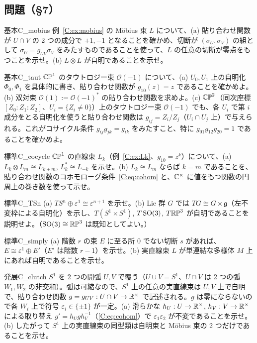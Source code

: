 \subsection*{問題（§7）}
\begin{probl}{基本}{C_mobius}
例~\ref{C:ex:mobius} の Möbius 束 $L$ について、(a) 貼り合わせ関数が $U\cap V$ の 2 つの成分で $+1,-1$ となることを確かめ、切断が $(\sigma_U,\sigma_V)$ の組として $\sigma_U=g_{UV}\sigma_V$ をみたすものであることを使って、$L$ の任意の切断が零点をもつことを示せ。(b) $L\otimes L$ が自明であることを示せ。
\end{probl}
\begin{probl}{基本}{C_taut}
$\mathbb{CP}^1$ のタウトロジー束 $\mathcal O(-1)$ について、(a) $U_0,U_1$ 上の自明化 $\Phi_0,\Phi_1$ を具体的に書き、貼り合わせ関数が $g_{10}(z)=z$ であることを確かめよ。(b) 双対束 $\mathcal O(1):=\mathcal O(-1)^*$ の貼り合わせ関数を求めよ。(c) $\mathbb{CP}^2$（同次座標 $[Z_0:Z_1:Z_2]$、$U_i=\{Z_i\ne0\}$）上のタウトロジー束 $\mathcal O(-1)$ でも、各 $U_i$ で第 $i$ 成分をとる自明化を使うと貼り合わせ関数は $g_{ij}=Z_i/Z_j$（$U_i\cap U_j$ 上）で与えられる。これがコサイクル条件 $g_{ij}g_{jk}=g_{ik}$ をみたすこと、特に $g_{01}g_{12}g_{20}=1$ であることを確かめよ。
\end{probl}
\begin{probl}{標準}{C_cocycle}
$\mathbb{CP}^1$ の直線束 $L_k$（例~\ref{C:ex:Lk}、$g_{10}=z^k$）について、(a) $L_k\otimes L_m\cong L_{k+m}$, $L_k^*\cong L_{-k}$ を示せ。(b) $L_k\cong L_m$ ならば $k=m$ であることを、貼り合わせ関数のコホモローグ条件~\eqref{C:eq:cohom} と、$\mathbb C^\times$ に値をもつ関数の円周上の巻き数を使って示せ。
\end{probl}
\begin{probl}{標準}{C_TSn}
(a) $TS^n\oplus\varepsilon^1\cong\varepsilon^{n+1}$ を示せ。(b) Lie 群 $G$ では $TG\cong G\times\mathfrak g$（左不変枠による自明化）を示し、$T(S^1\times S^1)$, $T\,\mathrm{SO}(3)$, $T\mathbb{RP}^3$ が自明であることを説明せよ。（$\mathrm{SO}(3)\cong\mathbb{RP}^3$ は既知としてよい。）
\end{probl}
\begin{probl}{標準}{C_simply}
(a) 階数 $r$ の束 $E$ に至る所 $0$ でない切断 $s$ があれば、$E\cong\varepsilon^1\oplus E'$（$E'$ は階数 $r-1$）を示せ。(b) 実直線束 $L$ が単連結な多様体 $M$ 上にあれば自明であることを示せ。
\end{probl}
\begin{probl}{発展}{C_clutch}
$S^1$ を 2 つの開弧 $U,V$ で覆う（$U\cup V=S^1$、$U\cap V$ は 2 つの弧 $W_1,W_2$ の非交和）。弧は可縮なので、$S^1$ 上の任意の実直線束は $U,V$ 上で自明で、貼り合わせ関数 $g=g_{UV}:U\cap V\to\mathbb R^\times$ で記述される。$g$ は零にならないので各 $W_i$ 上で符号 $\varepsilon_i\in\{\pm1\}$ が一定。(a) 滑らかな $h_U:U\to\mathbb R^\times$, $h_V:V\to\mathbb R^\times$ による取り替え $g'=h_Ugh_V^{-1}$（\eqref{C:eq:cohom}）で $\varepsilon_1\varepsilon_2$ が不変であることを示せ。(b) したがって $S^1$ 上の実直線束の同型類は自明束と Möbius 束の 2 つだけであることを示せ。
\end{probl}

